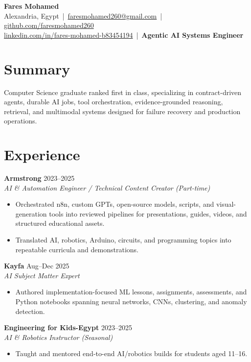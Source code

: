 \documentclass[letterpaper]{article}
\newcommand{\roleline}[3]{\textbf{#1} \hfill #2 \\\textit{#3} \\}
\begin{document}
\footnotesize
\begin{center}
{\LARGE \textbf{Fares Mohamed}}\\[3pt]
Alexandria, Egypt \,|\, \href{mailto:faresmohamed260@gmail.com}{faresmohamed260@gmail.com} \,|\, \href{https://github.com/faresmohamed260}{github.com/faresmohamed260}\\
\href{https://www.linkedin.com/in/fares-mohamed-b83454194/}{linkedin.com/in/fares-mohamed-b83454194} \,|\, \textbf{Agentic AI Systems Engineer}
\end{center}

\section*{Summary}
Computer Science graduate ranked first in class, specializing in contract-driven agents, durable AI jobs, tool orchestration, evidence-grounded reasoning, retrieval, and multimodal systems designed for failure recovery and production operations.

\section*{Experience}
\roleline{Armstrong}{2023--2025}{AI \& Automation Engineer / Technical Content Creator (Part-time)}
\begin{itemize}
\item Orchestrated n8n, custom GPTs, open-source models, scripts, and visual-generation tools into reviewed pipelines for presentations, guides, videos, and structured educational assets.
\item Translated AI, robotics, Arduino, circuits, and programming topics into repeatable curricula and demonstrations.
\end{itemize}
\roleline{Kayfa}{Aug--Dec 2025}{AI Subject Matter Expert}
\begin{itemize}
\item Authored implementation-focused ML lessons, assignments, assessments, and Python notebooks spanning neural networks, CNNs, clustering, and anomaly detection.
\end{itemize}
\roleline{Engineering for Kids-Egypt}{2023--2025}{AI \& Robotics Instructor (Seasonal)}
\begin{itemize}
\item Taught and mentored end-to-end AI/robotics builds for students aged 11--16.
\end{itemize}
\end{document}
